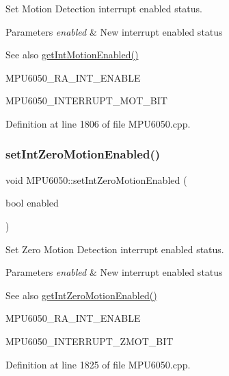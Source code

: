 Set Motion Detection interrupt enabled status. 


\begin{DoxyParams}{Parameters}
{\em enabled} & New interrupt enabled status \\
\hline
\end{DoxyParams}
\begin{DoxySeeAlso}{See also}
\mbox{\hyperlink{classMPU6050_a7de31a8e9f22765329d9f9e02db2f1f0}{get\+Int\+Motion\+Enabled()}} 

M\+P\+U6050\+\_\+\+R\+A\+\_\+\+I\+N\+T\+\_\+\+E\+N\+A\+B\+LE 

M\+P\+U6050\+\_\+\+I\+N\+T\+E\+R\+R\+U\+P\+T\+\_\+\+M\+O\+T\+\_\+\+B\+IT 
\end{DoxySeeAlso}


Definition at line 1806 of file M\+P\+U6050.\+cpp.

\mbox{\label{classMPU6050_a5e36e3acace6e545718d7997169cff9b}} 
\subsubsection{\texorpdfstring{setIntZeroMotionEnabled()}{setIntZeroMotionEnabled()}}
{\footnotesize\ttfamily void M\+P\+U6050\+::set\+Int\+Zero\+Motion\+Enabled (\begin{DoxyParamCaption}\item[{bool}]{enabled }\end{DoxyParamCaption})}



Set Zero Motion Detection interrupt enabled status. 


\begin{DoxyParams}{Parameters}
{\em enabled} & New interrupt enabled status \\
\hline
\end{DoxyParams}
\begin{DoxySeeAlso}{See also}
\mbox{\hyperlink{classMPU6050_ab3cc9bcaca6cec61e7f3f0c6c8a37db5}{get\+Int\+Zero\+Motion\+Enabled()}} 

M\+P\+U6050\+\_\+\+R\+A\+\_\+\+I\+N\+T\+\_\+\+E\+N\+A\+B\+LE 

M\+P\+U6050\+\_\+\+I\+N\+T\+E\+R\+R\+U\+P\+T\+\_\+\+Z\+M\+O\+T\+\_\+\+B\+IT 
\end{DoxySeeAlso}


Definition at line 1825 of file M\+P\+U6050.\+cpp.

